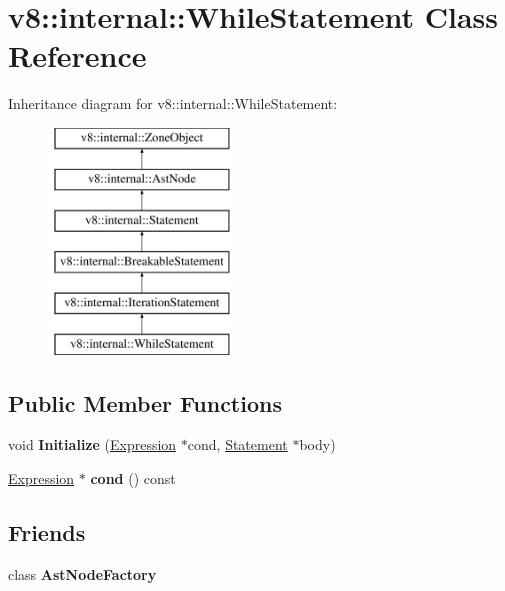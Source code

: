 \hypertarget{classv8_1_1internal_1_1WhileStatement}{}\section{v8\+:\+:internal\+:\+:While\+Statement Class Reference}
\label{classv8_1_1internal_1_1WhileStatement}
Inheritance diagram for v8\+:\+:internal\+:\+:While\+Statement\+:\begin{figure}[H]
\begin{center}
\leavevmode
\includegraphics[height=6.000000cm]{classv8_1_1internal_1_1WhileStatement}
\end{center}
\end{figure}
\subsection*{Public Member Functions}
\begin{DoxyCompactItemize}
\item 
\mbox{\label{classv8_1_1internal_1_1WhileStatement_a6610a43ac9c87a2f6aaebfbe4df791fe}} 
void {\bfseries Initialize} (\mbox{\hyperlink{classv8_1_1internal_1_1Expression}{Expression}} $\ast$cond, \mbox{\hyperlink{classv8_1_1internal_1_1Statement}{Statement}} $\ast$body)
\item 
\mbox{\label{classv8_1_1internal_1_1WhileStatement_a2cc1c2cae29ca39a715537d9cdd56d38}} 
\mbox{\hyperlink{classv8_1_1internal_1_1Expression}{Expression}} $\ast$ {\bfseries cond} () const
\end{DoxyCompactItemize}
\subsection*{Friends}
\begin{DoxyCompactItemize}
\item 
\mbox{\label{classv8_1_1internal_1_1WhileStatement_a8d587c8ad3515ff6433eb83c578e795f}} 
class {\bfseries Ast\+Node\+Factory}
\end{DoxyCompactItemize}
